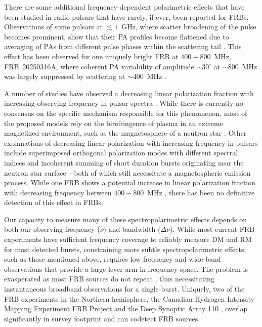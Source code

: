 \documentclass[twocolumn, linenumbers]{aastex701}
\begin{document}
There are some additional frequency-dependent polarimetric effects that have been studied in radio pulsars that have rarely, if ever, been reported for FRBs. Observations of some pulsars at $\lesssim 1$~GHz, where scatter broadening of the pulse becomes prominent, show that their PA profiles become flattened due to averaging of PAs from different pulse phases within the scattering tail \citep[e.g.,][]{1972AuJPh..25..759K, 2003A&A...410..253L, 2009MNRAS.392L..60K, 2009MNRAS.396.1559N, 2023RAA....23j4002W}. This effect has been observed for one uniquely bright FRB at $400-800$~MHz, FRB~20250316A, where coherent PA variability of amplitude $\sim 30^\circ$ at $\sim 800$~MHz was largely suppressed by scattering at $\sim 400$~MHz \citep{2025ApJ...989L..48C}. 

A number of studies have observed a decreasing linear polarization fraction with increasing observing frequency in pulsar spectra \citep[e.g.,][]{1973ApJ...179L...7M, 1996A&A...309..481X, 1997ApJ...475..763M, 2008MNRAS.388..261J, 2015A&A...576A..62N}. While there is currently no consensus on the specific mechanism responsible for this phenomenon, most of the proposed models rely on the birefringence of plasma in an extreme magnetized environment, such as the magnetosphere of a neutron star \citep{1975ApJ...196...51R, 1986ApJ...302..138B, 1997ApJ...475..763M, 1998A&A...336..209V}. Other explanations of decreasing linear polarization with increasing frequency in pulsars include superimposed orthogonal polarization modes with different spectral indices \citep{2005MNRAS.359..481K} and incoherent summing of short duration bursts originating near the neutron star surface \citep{2008MNRAS.388..261J}$-$both of which still necessitate a magnetospheric emission process. While one FRB shows a potential increase in linear polarization fraction with decreasing frequency between $400-800$~MHz \citep{2024ApJ...968...50P}, there has been no definitive detection of this effect in FRBs.

Our capacity to measure many of these spectropolarimetric effects depends on both our observing frequency ($\nu$) and bandwidth ($\Delta \nu$). While most current FRB experiments have sufficient frequency coverage to reliably measure DM and RM for most detected bursts, constraining more subtle spectropolarimetric effects, such as those mentioned above, requires low-frequency and wide-band observations that provide a large lever arm in frequency space. The problem is exasperated as most FRB sources do not repeat \citep{2023ApJ...947...83C}, thus necessitating instantaneous broadband observations for a single burst. Uniquely, two of the FRB experiments in the Northern hemisphere, the Canadian Hydrogen Intensity Mapping Experiment FRB Project \citep[CHIME/FRB, observing at $400-800$~MHz;][]{2018ApJ...863...48C} and the Deep Synoptic Array 110 \citep[DSA-110, observing at $1280-1530$~MHz;][]{2024ApJ...967...29L}, overlap significantly in survey footprint and can codetect FRB sources.
\end{document}
